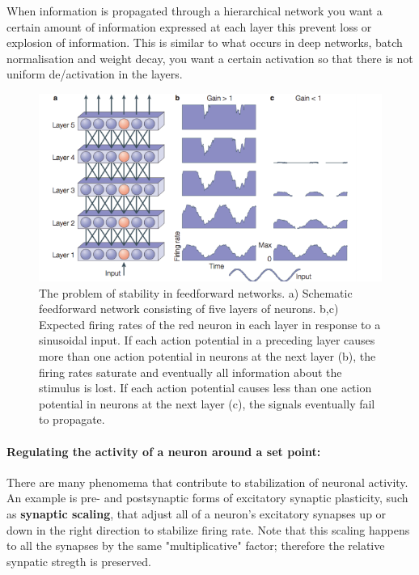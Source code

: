 \documentclass[main]{subfiles}
\begin{document}
\noindent
When information is propagated through a hierarchical network you want a certain amount of information expressed at each layer this prevent loss or explosion of information. This is similar to what occurs in deep networks, batch normalisation and weight decay, you want a certain activation so that there is not uniform de/activation in the layers.

\begin{figure}[H]
    \centering
    \includegraphics[width=.9\textwidth]{03_PlasticityInTheBrain/figures/pasted_image_5.png}
    \caption{The problem of stability in feedforward networks. a) Schematic feedforward network consisting of five layers of neurons. b,c) Expected firing rates of the red neuron in each layer in response to a sinusoidal input. If each action potential in a preceding layer causes more than one action potential in neurons at the next layer (b), the firing rates saturate and eventually all information about the stimulus is lost. If each action potential causes less than one action potential in neurons at the next layer (c), the signals eventually fail to propagate.}
    \label{fig:feedforwardnet_instability}
\end{figure}

\paragraph{Regulating the activity of a neuron around a set point:} There are many phenomema that contribute to stabilization of neuronal activity. An example is pre- and postsynaptic forms of excitatory synaptic plasticity, such as \textbf{synaptic scaling}, that adjust all of a neuron’s excitatory synapses up or down in the right direction to stabilize firing rate. Note that this scaling happens to all the synapses by the same "multiplicative" factor; therefore the relative synpatic stregth is preserved. 
\end{document}
